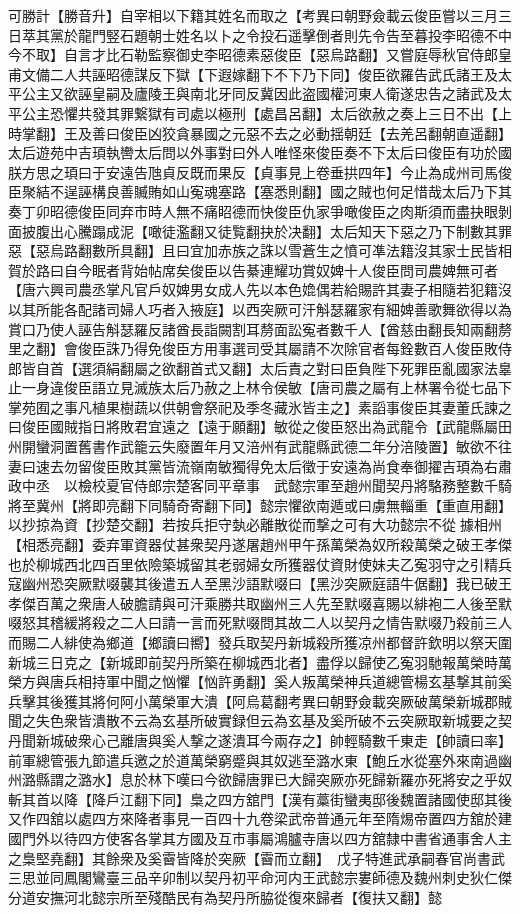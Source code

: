 可勝計【勝音升】自宰相以下籍其姓名而取之【考異曰朝野僉載云俊臣嘗以三月三日萃其黨於龍門竪石題朝士姓名以卜之令投石遥擊倒者則先令告至暮投李昭德不中今不取】自言才比石勒監察御史李昭德素惡俊臣【惡烏路翻】又嘗庭辱秋官侍郎皇甫文備二人共誣昭德謀反下獄【下遐嫁翻下不下乃下同】俊臣欲羅告武氏諸王及太平公主又欲誣皇嗣及廬陵王與南北牙同反冀因此盗國權河東人衛遂忠告之諸武及太平公主恐懼共發其罪繋獄有司處以極刑【處昌呂翻】太后欲赦之奏上三日不出【上時掌翻】王及善曰俊臣凶狡貪暴國之元惡不去之必動揺朝廷【去羌呂翻朝直遥翻】太后遊苑中吉頊執轡太后問以外事對曰外人唯怪來俊臣奏不下太后曰俊臣有功於國朕方思之頊曰于安遠告虺貞反既而果反【貞事見上卷垂拱四年】今止為成州司馬俊臣聚結不逞誣構良善贓賄如山寃魂塞路【塞悉則翻】國之賊也何足惜哉太后乃下其奏丁卯昭德俊臣同弃市時人無不痛眧德而快俊臣仇家爭噉俊臣之肉斯須而盡抉眼剝面披腹出心騰蹋成泥【噉徒濫翻又徒覧翻抉於决翻】太后知天下惡之乃下制數其罪惡【惡烏路翻數所具翻】且曰宜加赤族之誅以雪蒼生之憤可凖法籍沒其家士民皆相賀於路曰自今眠者背始帖席矣俊臣以告綦連耀功賞奴婢十人俊臣問司農婢無可者【唐六興司農丞掌凡官戶奴婢男女成人先以本色嫓偶若給賜許其妻子相隨若犯籍沒以其所能各配諸司婦人巧者入掖庭】以西突厥可汗斛瑟羅家有細婢善歌舞欲得以為賞口乃使人誣告斛瑟羅反諸酋長詣闕割耳剺面訟寃者數千人【酋慈由翻長知兩翻剺里之翻】會俊臣誅乃得免俊臣方用事選司受其屬請不次除官者每銓數百人俊臣敗侍郎皆自首【選須絹翻屬之欲翻首式又翻】太后責之對曰臣負陛下死罪臣亂國家法辠止一身違俊臣語立見滅族太后乃赦之上林令侯敏【唐司農之屬有上林署令從七品下掌苑囿之事凡植果樹蔬以供朝會祭祀及季冬藏氷皆主之】素謟事俊臣其妻董氏諫之曰俊臣國賊指日將敗君宜遠之【遠于願翻】敏從之俊臣怒出為武龍令【武龍縣屬田州開蠻洞置舊書作武籠云失廢置年月又涪州有武龍縣武德二年分涪陵置】敏欲不往妻曰速去勿留俊臣敗其黨皆流嶺南敏獨得免太后徵于安遠為尚食奉御擢吉頊為右肅政中丞　以檢校夏官侍郎宗楚客同平章事　武懿宗軍至趙州聞契丹將駱務整數千騎將至冀州【將即亮翻下同騎奇寄翻下同】懿宗懼欲南遁或曰虜無輜重【重直用翻】以抄掠為資【抄楚交翻】若按兵拒守埶必離散從而撃之可有大功懿宗不從據相州【相悉亮翻】委弃軍資器仗甚衆契丹遂屠趙州甲午孫萬榮為奴所殺萬榮之破王孝傑也於柳城西北四百里依險築城留其老弱婦女所獲器仗資財使妹夫乙寃羽守之引精兵寇幽州恐突厥默啜襲其後遣五人至黑沙語默啜曰【黑沙突厥庭語牛倨翻】我已破王孝傑百萬之衆唐人破膽請與可汗乘勝共取幽州三人先至默啜喜賜以緋袍二人後至默啜怒其稽緩將殺之二人曰請一言而死默啜問其故二人以契丹之情告默啜乃殺前三人而賜二人緋使為鄉道【鄉讀曰嚮】發兵取契丹新城殺所獲凉州都督許欽明以祭天圍新城三日克之【新城即前契丹所築在柳城西北者】盡俘以歸使乙寃羽馳報萬榮時萬榮方與唐兵相持軍中聞之忷懼【忷許勇翻】奚人叛萬榮神兵道總管楊玄基撃其前奚兵擊其後獲其將何阿小萬榮軍大潰【阿烏葛翻考異曰朝野僉載突厥破萬榮新城郡賊聞之失色衆皆潰散不云為玄基所破實録但云為玄基及奚所破不云突厥取新城要之契丹聞新城破衆心己離唐與奚人撃之遂潰耳今兩存之】帥輕騎數千東走【帥讀曰率】前軍總管張九節遣兵邀之於道萬榮窮蹙與其奴逃至潞水東【鮑丘水從塞外來南過幽州潞縣謂之潞水】息於林下嘆曰今欲歸唐罪已大歸突厥亦死歸新羅亦死將安之乎奴斬其首以降【降戶江翻下同】梟之四方舘門【漢有藁街蠻夷邸後魏置諸國使邸其後又作四舘以處四方來降者事見一百四十九卷梁武帝普通元年至隋焬帝置四方舘於建國門外以待四方使客各掌其方國及互市事屬鴻臚寺唐以四方舘隸中書省通事舍人主之梟堅堯翻】其餘衆及奚霫皆降於突厥【霫而立翻】　戊子特進武承嗣春官尚書武三思並同鳳閣鸞臺三品辛卯制以契丹初平命河内王武懿宗婁師德及魏州刺史狄仁傑分道安撫河北懿宗所至殘酷民有為契丹所脇從復來歸者【復扶又翻】懿